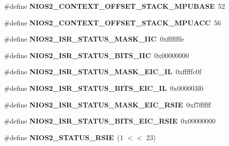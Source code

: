 \begin{DoxyCompactItemize}
\mbox{\label{nios2-utility_8h_a44b9510fd3ae6eb37c23006d21be0f35}} 
\#define {\bfseries N\+I\+O\+S2\+\_\+\+C\+O\+N\+T\+E\+X\+T\+\_\+\+O\+F\+F\+S\+E\+T\+\_\+\+S\+T\+A\+C\+K\+\_\+\+M\+P\+U\+B\+A\+SE}~52
\item 
\mbox{\label{nios2-utility_8h_a6beed1e2ab0b47edf63d72cefca74c56}} 
\#define {\bfseries N\+I\+O\+S2\+\_\+\+C\+O\+N\+T\+E\+X\+T\+\_\+\+O\+F\+F\+S\+E\+T\+\_\+\+S\+T\+A\+C\+K\+\_\+\+M\+P\+U\+A\+CC}~56
\item 
\mbox{\label{nios2-utility_8h_affd33a5b0bfeeae880af85ea41c11ab2}} 
\#define {\bfseries N\+I\+O\+S2\+\_\+\+I\+S\+R\+\_\+\+S\+T\+A\+T\+U\+S\+\_\+\+M\+A\+S\+K\+\_\+\+I\+IC}~0xfffffffe
\item 
\mbox{\label{nios2-utility_8h_a499339d86604ebd16c4792f177808693}} 
\#define {\bfseries N\+I\+O\+S2\+\_\+\+I\+S\+R\+\_\+\+S\+T\+A\+T\+U\+S\+\_\+\+B\+I\+T\+S\+\_\+\+I\+IC}~0x00000000
\item 
\mbox{\label{nios2-utility_8h_a9db63e9c6316085ce6728ea9975d7593}} 
\#define {\bfseries N\+I\+O\+S2\+\_\+\+I\+S\+R\+\_\+\+S\+T\+A\+T\+U\+S\+\_\+\+M\+A\+S\+K\+\_\+\+E\+I\+C\+\_\+\+IL}~0xfffffc0f
\item 
\mbox{\label{nios2-utility_8h_af6932e9d87d736e696b6a4dd995b70c3}} 
\#define {\bfseries N\+I\+O\+S2\+\_\+\+I\+S\+R\+\_\+\+S\+T\+A\+T\+U\+S\+\_\+\+B\+I\+T\+S\+\_\+\+E\+I\+C\+\_\+\+IL}~0x000003f0
\item 
\mbox{\label{nios2-utility_8h_a60d94ab392612b94e6828096618365a0}} 
\#define {\bfseries N\+I\+O\+S2\+\_\+\+I\+S\+R\+\_\+\+S\+T\+A\+T\+U\+S\+\_\+\+M\+A\+S\+K\+\_\+\+E\+I\+C\+\_\+\+R\+S\+IE}~0xf7ffffff
\item 
\mbox{\label{nios2-utility_8h_a47571a44d5612fe0e37a62abc4c88d70}} 
\#define {\bfseries N\+I\+O\+S2\+\_\+\+I\+S\+R\+\_\+\+S\+T\+A\+T\+U\+S\+\_\+\+B\+I\+T\+S\+\_\+\+E\+I\+C\+\_\+\+R\+S\+IE}~0x00000000
\item 
\mbox{\label{nios2-utility_8h_a6bd3e213ac9dd92dbdd9bef5c323f638}} 
\#define {\bfseries N\+I\+O\+S2\+\_\+\+S\+T\+A\+T\+U\+S\+\_\+\+R\+S\+IE}~(1 $<$$<$ 23)
$$
\end{DoxyCompactItemize}
